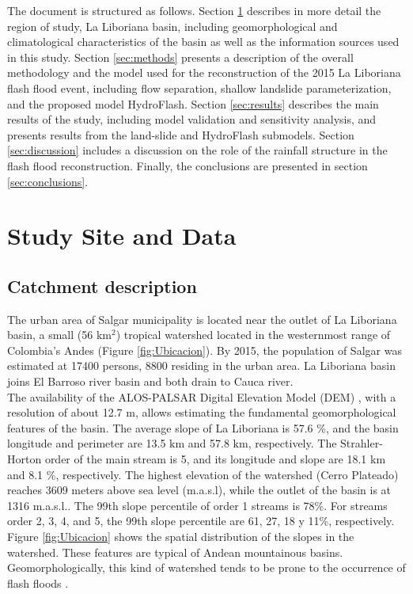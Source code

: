 \documentclass[hess, manuscript]{copernicus}
\begin{document}
The document is structured as follows. Section \ref{sec:data} describes in more detail the region of study, La Liboriana basin, including geomorphological and climatological characteristics of the basin as well as the information sources used in this study. Section \ref{sec:methods} presents a description of the overall methodology and the model used for the reconstruction of the 2015 La Liboriana flash flood event, including flow separation, shallow landslide parameterization, and the proposed model HydroFlash. Section \ref{sec:results} describes the main results of the study, including model validation and sensitivity analysis, and presents results from the land-slide and HydroFlash submodels. Section \ref{sec:discussion} includes a discussion on the role of the rainfall structure in the flash flood reconstruction.  Finally,  the conclusions are presented in section \ref{sec:conclusions}.

\section{Study Site and Data}
\label{sec:data}

\subsection{Catchment description}

The urban area of Salgar municipality is located near the outlet of La Liboriana basin, a small (56 km$^2$) tropical watershed located in the westernmost range of Colombia's Andes (Figure \ref{fig:Ubicacion}).  By 2015, the population of Salgar was estimated at 17400 persons, 8800 residing in the urban area.  La Liboriana basin joins El Barroso river basin and both drain to Cauca river. \\

The availability of the ALOS-PALSAR Digital Elevation Model (DEM) \citep{ALOS}, with a resolution of about 12.7 m, allows estimating the fundamental geomorphological features of the basin. The average slope of La Liboriana is  57.6 \%, and the basin longitude and perimeter are 13.5 $\text{km}$ and 57.8 $\text{km}$, respectively.  The Strahler-Horton order of the main stream is 5, and its longitude and slope are 18.1 $\text{km}$ and 8.1 \%, respectively. The highest elevation of the watershed (Cerro Plateado) reaches 3609 meters above sea level (m.a.s.l), while the outlet of the basin is at 1316 m.a.s.l..  The 99th slope percentile of order 1 streams is 78\%. For streams order 2, 3, 4, and 5, the 99th slope percentile are 61, 27, 18 y 11\%, respectively. Figure \ref{fig:Ubicacion} shows the spatial distribution of the slopes in the watershed. These features are typical of Andean mountainous basins.  Geomorphologically, this kind of watershed tends to be prone to the occurrence of flash floods \citep{Lehmann2012, Penna2011, Martin2018,Longoni2016, Ozturk2018, Khosravi2018, Marchi2016, Bisht2018}.\\
\end{document}
